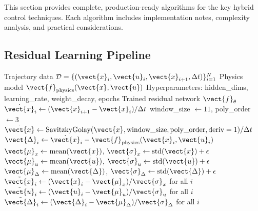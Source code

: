 This section provides complete, production-ready algorithms for the key hybrid control techniques. Each algorithm includes implementation notes, complexity analysis, and practical considerations.

\subsection{Residual Learning Pipeline}
\label{subsec:alg_residual}

\begin{algorithm}[H]
\caption{Complete Residual Dynamics Learning Pipeline}
\label{alg:residual_pipeline}
\begin{algorithmic}[1]
\REQUIRE Trajectory data $\mathcal{D} = \{(\vect{x}_i, \vect{u}_i, \vect{x}_{i+1}, \Delta t)\}_{i=1}^N$
\REQUIRE Physics model $\vect{f}_{\text{physics}}(\vect{x}, \vect{u})$
\REQUIRE Hyperparameters: hidden\_dims, learning\_rate, weight\_decay, epochs
\ENSURE Trained residual network $\vect{f}_\theta$
\STATE
\STATE {}
    \STATE $\dot{\vect{x}}_i \gets (\vect{x}_{i+1} - \vect{x}_i) / \Delta t$ 
\ENDFOR
\STATE
\STATE {}
\STATE window\_size $\gets 11$, poly\_order $\gets 3$
\STATE $\dot{\vect{x}} \gets \text{SavitzkyGolay}(\vect{x}, \text{window\_size}, \text{poly\_order}, \text{deriv}=1) / \Delta t$
\STATE
\STATE {}
    \STATE $\vect{\Delta}_i \gets \dot{\vect{x}}_i - \vect{f}_{\text{physics}}(\vect{x}_i, \vect{u}_i)$
\ENDFOR
\STATE
\STATE {}
\STATE $\vect{\mu}_x \gets \text{mean}(\vect{x})$, $\vect{\sigma}_x \gets \text{std}(\vect{x}) + \epsilon$
\STATE $\vect{\mu}_u \gets \text{mean}(\vect{u})$, $\vect{\sigma}_u \gets \text{std}(\vect{u}) + \epsilon$
\STATE $\vect{\mu}_\Delta \gets \text{mean}(\vect{\Delta})$, $\vect{\sigma}_\Delta \gets \text{std}(\vect{\Delta}) + \epsilon$
\STATE
\STATE {}
\STATE $\tilde{\vect{x}}_i \gets (\vect{x}_i - \vect{\mu}_x) / \vect{\sigma}_x$ for all $i$
\STATE $\tilde{\vect{u}}_i \gets (\vect{u}_i - \vect{\mu}_u) / \vect{\sigma}_u$ for all $i$
\STATE $\tilde{\vect{\Delta}}_i \gets (\vect{\Delta}_i - \vect{\mu}_\Delta) / \vect{\sigma}_\Delta$ for all $i$
\STATE
\STATE {}

\end{algorithmic}
\end{algorithm}
